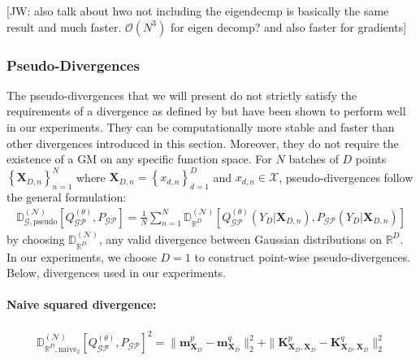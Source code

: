 \documentclass{article}
\newcommand{\jw}[1]{{\color{gray} [JW: #1]}}
\newcommand{\GP}{\operatorname{\mathcal{GP}}}
\numberwithin{equation}{section}
\begin{document}
\jw{also talk about hwo not including the eigendecmp is basically the same result and much faster. $\mathcal{O}(N^3)$ for eigen decomp? and also faster for gradients}

\subsubsection{Pseudo-Divergences}
The pseudo-divergences that we will present do not strictly satisfy the requirements of a divergence as defined by \cite{knoblauch2022optimization} but have been shown to perform well in our experiments. They can be computationally more stable and faster than other divergences introduced in this section. Moreover, they do not require the existence of a GM on any specific function space. For $N$ batches of $D$ points $\left\{\mathbf{X}_{D, n}\right\}_{n=1}^N$ where $\mathbf{X}_{D, n}=\left\{x_{d, n}\right\}_{d=1}^D$ and $x_{d, n} \in \mathcal{X}$, pseudo-divergences follow the general formulation:
\begin{align}
    \mathbb{D}_{\mathcal{G}, \text{pseudo}}^{(\mathcal{N})} \left[Q_{\GP}^{(\theta)}, P_{\GP}\right] = \frac{1}{N}\sum_{n=1}^N \mathbb{D}_{\mathbb{R}^D}^{(\mathcal{N})}\left[Q_{\GP}^{(\theta)}(Y_D\vert \mathbf{X}_{D, n}), P_{\GP}(Y_D\vert \mathbf{X}_{D, n})\right]
\end{align}
by choosing $\mathbb{D}_{\mathbb{R}^D}^{(\mathcal{N})}$,  any valid divergence between Gaussian distributions on $\mathbb{R}^D$. In our experiments, we choose $D=1$ to construct point-wise pseudo-divergences. Below, divergences used in our experiments.
\paragraph{Naive squared divergence:} 
\begin{align}
    \mathbb{D}_{\mathbb{R}^D, \text{naive}_2}^{(\mathcal{N})} \left[Q_{\GP}^{(\theta)}, P_{\GP}\right]^2 = \|\mathbf{m}_{\mathbf{X}_D}^p - \mathbf{m}_{\mathbf{X}_D}^q\|_2^2 + \|\mathbf{K}_{\mathbf{X}_D, \mathbf{X}_D}^p - \mathbf{K}_{\mathbf{X}_D, \mathbf{X}_D}^q\|_2^2
\end{align}
\end{document}
